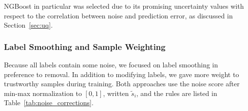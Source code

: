 NGBoost in particular was selected due to its promising uncertainty values with respect to the correlation between noise and prediction error, as discussed in Section~\ref{sec:uq}.  

\subsubsection{Label Smoothing and Sample Weighting}

Because all labels contain some noise, we focused on label smoothing in preference to removal. In addition to modifying labels, we gave more weight to trustworthy samples during training. Both approaches use the noise score after min-max normalization to $[0, 1]$, written $\tilde s_i$, and the rules are listed in Table~\ref{tab:noise_corrections}.

